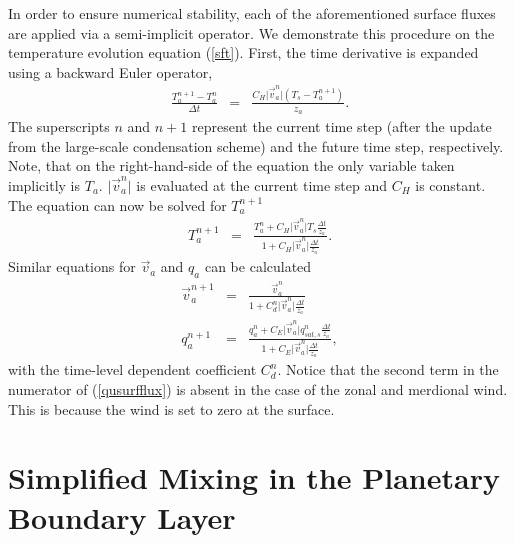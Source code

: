 \documentclass[times,doublespace]{fldauth}
\begin{document}
{\begin{appendix}
In order to ensure numerical stability, each of the aforementioned surface fluxes are applied via a semi-implicit operator.  We demonstrate this procedure on the temperature evolution equation (\ref{sft}).  First, the time derivative is expanded using a backward Euler operator,
\begin{eqnarray}
\frac{T_a^{n+1}-T_a^n}{\Delta t} &=& \frac{C_H \vert \vec{v}_a^n \vert (T_s-T_a^{n+1})}{z_a}.
\end{eqnarray}
The superscripts $n$ and $n+1$ represent the current time step (after the update from the large-scale condensation scheme) and the future time step, respectively. Note, that on the right-hand-side of the equation the only variable taken implicitly is $T_a$. $\vert \vec{v}_a^n \vert$ is evaluated at the current time step and $C_H$ is constant. The equation can now be solved for $T_a^{n+1}$
\begin{eqnarray} \label{Tsurfflux}
T_a^{n+1} &=& \frac{T_a^n + C_H \vert \vec{v}_a^n \vert T_s \frac{\Delta t}{z_a}}{1 + C_H \vert \vec{v}_a^n \vert\frac{\Delta t}{z_a}}.
\end{eqnarray}
Similar equations for $\vec{v}_a$ and $q_a$ can be calculated
\begin{eqnarray}
\vec{v}_a^{n+1} &=& \frac{\vec{v}_a^n}{1 + C_d^n \vert \vec{v}_a^n \vert\frac{\Delta t}{z_a}} \label{qusurfflux}\\
q_a^{n+1} &=& \frac{q_a^n + C_E \vert \vec{v}_a^n \vert q_{sat,s}^n \frac{\Delta t}{z_a}}{1 + C_E \vert \vec{v}_a^n \vert\frac{\Delta t}{z_a}}, \label{qsurfflux}
\end{eqnarray} 
with the time-level dependent coefficient $C_d^n$. Notice that the second term in the numerator of (\ref{qusurfflux}) is absent in the case of the zonal and merdional wind. This is because the wind is set to zero at the surface.


\section{Simplified Mixing in the Planetary Boundary Layer} \label{sec:PlanetaryBoundaryLayer}


\end{appendix}}
\end{document}
